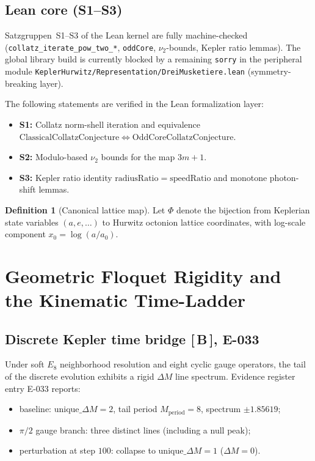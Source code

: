\documentclass[11pt, lettersize, article]{article}
\theoremstyle{definition}
\newtheorem{definition}[theorem]{Definition}
\theoremstyle{remark}
\newcommand{\evidence}[1]{\textnormal{[\,#1\,]}}
\newcommand{\PhiMap}{\Phi}
\begin{document}
\subsection{Lean core (S1--S3)}

Satzgruppen~S1--S3 of the Lean kernel are fully machine-checked
(\texttt{collatz\_iterate\_pow\_two\_*}, \texttt{oddCore}, $\nu_2$-bounds, Kepler ratio lemmas).
The global library build is currently blocked by a remaining \texttt{sorry} in the peripheral module
\texttt{KeplerHurwitz/Representation/DreiMusketiere.lean} (symmetry-breaking layer).

The following statements are verified in the Lean formalization layer:
\begin{itemize}
  \item \textbf{S1:} Collatz norm-shell iteration and equivalence
    $\mathrm{ClassicalCollatzConjecture} \Leftrightarrow \mathrm{OddCoreCollatzConjecture}$.
  \item \textbf{S2:} Modulo-based $\nu_2$ bounds for the map $3m+1$.
  \item \textbf{S3:} Kepler ratio identity $\mathrm{radiusRatio} = \mathrm{speedRatio}$ and monotone photon-shift lemmas.
\end{itemize}

\begin{definition}[Canonical lattice map]
Let $\PhiMap$ denote the bijection from Keplerian state variables $(a,e,\ldots)$ to Hurwitz octonion lattice coordinates, with log-scale component $x_0 = \log(a/a_0)$.
\end{definition}

\section{Geometric Floquet Rigidity and the Kinematic Time-Ladder}
\label{sec:floquet}

\subsection{Discrete Kepler time bridge \evidence{B}, E-033}

Under soft $E_8$ neighborhood resolution and eight cyclic gauge operators, the tail of the discrete evolution exhibits a rigid $\Delta M$ line spectrum.
Evidence register entry E-033 reports:
\begin{itemize}
  \item baseline: $\mathrm{unique\_}\Delta M = 2$, tail period $M_{\mathrm{period}}=8$, spectrum $\pm 1.85619$;
  \item $\pi/2$ gauge branch: three distinct lines (including a null peak);
  \item perturbation at step $100$: collapse to $\mathrm{unique\_}\Delta M = 1$ ($\Delta M = 0$).
\end{itemize}
\end{document}
